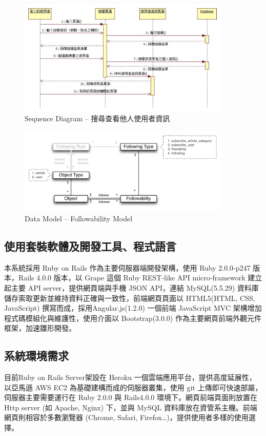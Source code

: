 \documentclass[11pt]{article}
\begin{document}
\begin{figure}[H]
\centering
\includegraphics[width=0.9\textwidth]{img/seq03.png}
\caption{Sequence Diagram -- 搜尋查看他人使用者資訊}
\end{figure}

\begin{figure}[H]
\centering
\includegraphics[width=0.9\textwidth]{img/followability_real.pdf}
\caption{Data Model -- Followability Model}
\end{figure}


\subsection{使用套裝軟體及開發工具、程式語言}
本系統採用 Ruby on Rails 作為主要伺服器端開發架構，使用 Ruby 2.0.0-p247 版本，Rails 4.0.0 版本，以 Grape 這個 Ruby REST-like API micro-framework 建立起主要 API server，提供網頁端與手機 JSON API，連結 MySQL(5.5.29) 資料庫儲存索取更新並維持資料正確與一致性，前端網頁頁面以 HTML5(HTML, CSS, JavaScript) 撰寫而成，採用Angular.js(1.2.0) 一個前端 JavaScript MVC 架構增加程式碼模組化與維護性，使用介面以 Bootstrap(3.0.0) 作為主要網頁前端外觀元件框架，加速雛形開發。
\subsection{系統環境需求}
目前Ruby on Rails Server架設在 Heroku 一個雲端應用平台，提供高度延展性，以亞馬遜 AWS EC2 為基礎建構而成的伺服器叢集，使用 git 上傳即可快速部屬，伺服器主要需要運行在 Ruby 2.0.0 與 Rails4.0.0 環境下。網頁前端頁面則放置在 Http server (如 Apache, Nginx) 下，並與 MySQL 資料庫放在資管系主機。前端網頁則相容於多數瀏覽器 (Chrome, Safari, Firefox…)，提供使用者多樣的使用選擇。
\end{document}
